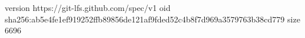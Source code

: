 version https://git-lfs.github.com/spec/v1
oid sha256:ab5e4fe1ef919252ffb89856de121af9fded52c4b8f7d969a3579763b38cd779
size 6696
